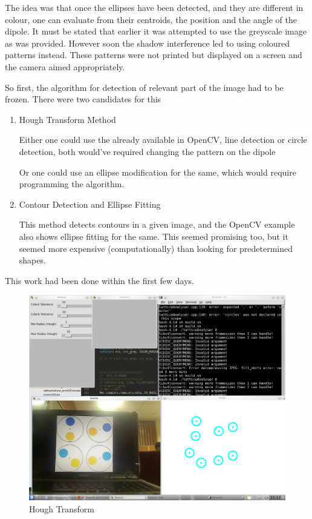 		The idea was that once the ellipses have been detected, and they are different in colour, one can evaluate from their centroids, the position and the angle of the dipole. It must be stated that earlier it was attempted to use the greyscale image as was provided. However soon the shadow interference led to using coloured patterns instead. These patterns were not printed but displayed on a screen and the camera aimed appropriately.
		\par
		So first, the algorithm for detection of relevant part of the image had to be frozen. There were two candidates for this
		\begin{enumerate}
			\item Hough Transform Method
				\par
				Either one could use the already available in OpenCV, line detection or circle detection, both would've required changing the pattern on the dipole
				\par
				Or one could use an ellipse modification for the same, which would require programming the algorithm.
			\item Contour Detection and Ellipse Fitting
				\par
				This method detects contours in a given image, and the OpenCV example also shows ellipse fitting for the same. This seemed promising too, but it seemed more expensive (computationally) than looking for predetermined shapes.
		\end{enumerate}
		This work had been done within the first few days. 
		\par

		\begin{figure}[bth]
			\begin{center}
				\includegraphics[width=1.1\linewidth]{../../latticeAnalyser/snapshot1.png}
			\end{center}
		\caption[Hough Transform]{Hough Transform}
		\label{snapshot1}
		\end{figure}

